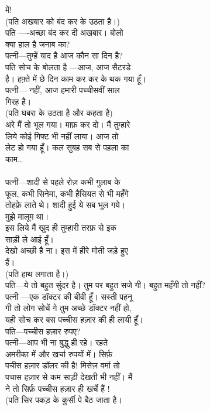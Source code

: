 {{{{{{{{{{में!\\
(पति अखबार को बंद कर के उठता है।)\\
पति —-अच्छा बंद कर दी अखबार। बोलो\\
क्या हाल है जनाब का?\\
पत्नी—तुम्हें याद है आज कौन सा दिन है?\\
पति सोच के बोलता है —आज, आज सैटरडे\\
है। हफ़्ते में छे दिन काम कर कर के थक गया हूँ।\\
पत्नी— नहीं, आज हमारी पच्चीसवीं साल\\
गिरह है।\\
(पति घबरा के उठता है और कहता है)\\
अरे मैं तो भूल गया। माफ़ कर दो। मैं तुम्हारे\\
लिये कोई गिफ्ट भी नहीं लाया। आज तो\\
लेट हो गया हूँ। कल सुबह सब से पहला का\\
काम…\\
\\
पत्नी—शादी से पहले रोज़ कभी गुलाब के \\
फूल, कभी सिनेमा, कभी हैसियत से भी महँगे\\
तोहफ़े लाते थे। शादी हुई ये सब भूल गये।\\
मुझे मालूम था।\\
इस लिये मैं खुद ही तुम्हारी तरफ़ से इक\\
साड़ी ले आई हूँ।\\
देखो अच्छी है ना। इस में हीरे मोती जड़े हुए\\
हैं।\\
(पति हाथ लगाता है।)\\
पति—ये तो बहुत सुंदर है। तुम पर बहुत सजे गी। बहुत महँगी तो नहीं?\\
पत्नी —एक डॉक्टर की बीवी हूँ। सस्ती पहनू \\
गी तो लोग सोचें गे तुम अच्छे डॉक्टर नहीं हो,\\
यही सोच कर बस पच्चीस हज़ार की ही लायी हूँ।\\
पति—पच्चीस हज़ार रुपए?\\
पत्नी—आप भी ना बुद्धु ही रहे। रहते \\
अमरीका में और खर्चा रुपयों में। सिर्फ़ \\
पचीस हज़ार डॉलर की है! मिसेज़ वर्मा तो \\
पचास हज़ार से कम साड़ी देखती भी नहीं। मैं \\
ने तो सिर्फ़ पच्चीस हज़ार ही खर्चे हैं !\\
(पति सिर पकड़ के कुर्सी पे बैठ जाता है।\\
}}}}}}}}}}
